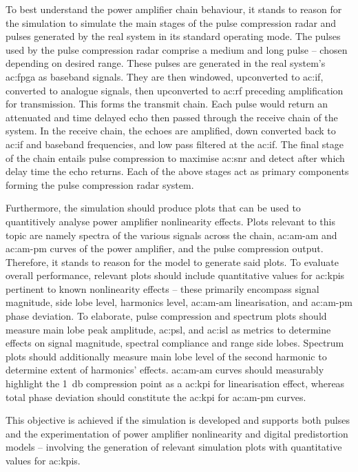 To best understand the power amplifier chain behaviour, it stands to reason for the simulation to simulate the main stages of the pulse compression radar and pulses generated by the real system in its standard operating mode. The pulses used by the pulse compression radar comprise a medium and long pulse – chosen depending on desired range. These pulses are generated in the real system’s \gls{ac:fpga} as baseband signals. They are then windowed, upconverted to \gls{ac:if}, converted to analogue signals, then upconverted to \gls{ac:rf} preceding amplification for transmission. This forms the transmit chain. Each pulse would return an attenuated and time delayed echo then passed through the receive chain of the system. In the receive chain, the echoes are amplified, down converted back to \gls{ac:if} and baseband frequencies, and low pass filtered at the \gls{ac:if}. The final stage of the chain entails pulse compression to maximise \gls{ac:snr} and detect after which delay time the echo returns. Each of the above stages act as primary components forming the pulse compression radar system.

Furthermore, the simulation should produce plots that can be used to quantitively analyse power amplifier nonlinearity effects. Plots relevant to this topic are namely spectra of the various signals across the chain, \gls{ac:am-am} and \gls{ac:am-pm} curves of the power amplifier, and the pulse compression output. Therefore, it stands to reason for the model to generate said plots. To evaluate overall performance, relevant plots should include quantitative values for \glspl{ac:kpi} pertinent to known nonlinearity effects – these primarily encompass signal magnitude, side lobe level, harmonics level, \gls{ac:am-am} linearisation, and \gls{ac:am-pm} phase deviation. To elaborate, pulse compression and spectrum plots should measure main lobe peak amplitude, \gls{ac:psl}, and \gls{ac:isl} as metrics to determine effects on signal magnitude, spectral compliance and range side lobes. Spectrum plots should additionally measure main lobe level of the second harmonic to determine extent of harmonics’ effects. \gls{ac:am-am} curves should measurably highlight the \qty{1}{\decibel} compression point as a \gls{ac:kpi} for linearisation effect, whereas total phase deviation should constitute the \gls{ac:kpi} for \gls{ac:am-pm} curves. 

This objective is achieved if the simulation is developed and supports both pulses and the experimentation of power amplifier nonlinearity and digital predistortion models – involving the generation of relevant simulation plots with quantitative values for \glspl{ac:kpi}. 

